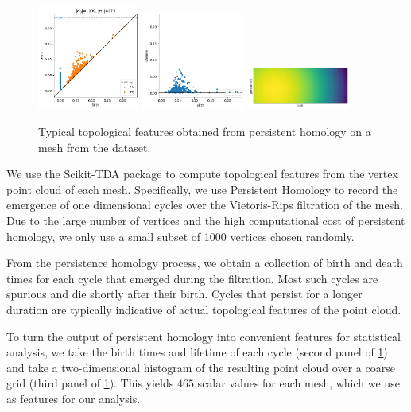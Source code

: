\documentclass[11pt]{article}
\begin{document}
\begin{figure}
    \centering
    \includegraphics[width=0.3\textwidth]{../plots/persistence-diagram.png}
    \includegraphics[width=0.3\textwidth]{../plots/birth-lifetime.png}
    \includegraphics[width=0.3\textwidth]{../plots/persistence-image.png}
    \caption{Typical topological features obtained from persistent homology on a mesh from the dataset.}
    \label{fig:tda}
\end{figure}

We use the Scikit-TDA package \cite{scikittda2019} to compute topological features from the vertex point cloud of each mesh. Specifically, we use Persistent Homology to record the emergence of one dimensional cycles over the Vietoris-Rips filtration of the mesh. Due to the large number of vertices and the high computational cost of persistent homology, we only use a small subset of 1000 vertices chosen randomly.

From the persistence homology process, we obtain a collection of birth and death times for each cycle that emerged during the filtration. Most such cycles are spurious and die shortly after their birth. Cycles that persist for a longer duration are typically indicative of actual topological features of the point cloud.

To turn the output of persistent homology into convenient features for statistical analysis, we take the birth times and lifetime of each cycle (second panel of \ref{fig:tda}) and take a two-dimensional histogram of the resulting point cloud over a coarse grid (third panel of \ref{fig:tda}). This yields $465$ scalar values for each mesh, which we use as features for our analysis.
\end{document}
